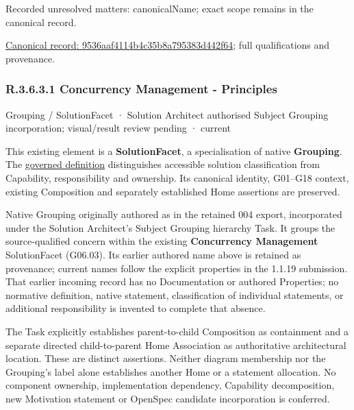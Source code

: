 {\small Recorded unresolved matters: canonicalName; exact scope remains in the canonical record.}\par
{\footnotesize \href{../../../../../../../continuum/grouping/9536aaf4114b4c35b8a795383d442f64.md}{Canonical record: 9536aaf4114b4c35b8a795383d442f64}; full qualifications and provenance.}\par
\subsubsection*{R.3.6.3.1 Concurrency Management - Principles}
\label{navigation:R.3.6.3.1}

\label{element:416367b1da96412299df199827b3541f}
{\small Grouping / SolutionFacet · Solution Architect authorised Subject Grouping incorporation; visual/result review pending · current}\par

This existing element is a \textbf{SolutionFacet}, a specialisation of native
\textbf{Grouping}. The \href{\detokenize{../../../../../../../governance/continuum-representation.md#solutionfacet-classification--1119-candidate}}{governed definition}
distinguishes accessible solution classification from Capability, responsibility
and ownership. Its canonical identity, G01–G18 context, existing Composition
and separately established Home assertions are preserved.



Native Grouping originally authored as \texttt{} in the retained 004 export,
incorporated under the Solution Architect's Subject Grouping hierarchy Task.
It groups the source-qualified \texttt{} concern within
the existing \textbf{Concurrency Management} SolutionFacet (G06.03). Its earlier authored name above is retained as provenance; current names
follow the explicit properties in the 1.1.19 submission.
That earlier incoming record has no Documentation or authored Properties; no normative
definition, native statement, classification of individual statements, or
additional responsibility is invented to complete that absence.



The Task explicitly establishes parent-to-child Composition as containment and
a separate directed child-to-parent Home Association as authoritative architectural
location. These are distinct assertions. Neither diagram membership nor the
Grouping's label alone establishes another Home or a statement allocation.
No component ownership, implementation dependency, Capability decomposition,
new Motivation statement or OpenSpec candidate incorporation is conferred.



